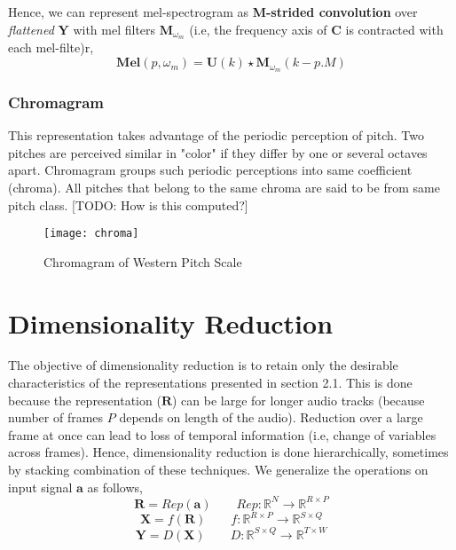 \noindent Hence, we can represent mel-spectrogram as \textbf{M-strided convolution} over \textit{flattened} $\textbf{Y}$ with mel filters $\textbf{M}_{\omega_{m}}$ (i.e, the frequency axis of $\textbf{C}$ is contracted with each mel-filte)r, 
\begin{equation}
\boxed
{
  \textbf{Mel}(p, \omega_{m} ) = \textbf{U}(k) \star \textbf{M}_{\omega_{m}}(k - p.M)
}
\end{equation}
  
\subsubsection{Chromagram}

This representation takes advantage of the periodic perception of pitch. Two pitches are perceived similar in "color" if they differ by one or several octaves apart. Chromagram groups such periodic perceptions into same coefficient (chroma). All pitches that belong to the same chroma are said to be from same pitch class. [TODO: How is this computed?]
\begin{figure}[h] 
\centering
\texttt{[image: chroma]}
\caption{Chromagram of Western Pitch Scale}
 \label{fig:Chromagram}
 \end{figure}
\FloatBarrier
\bigskip

\section{Dimensionality Reduction}
\label{dimension}
The objective of dimensionality reduction is to retain only the desirable characteristics of the representations presented in section 2.1. This is done because the representation ($\textbf{R}$) can be large for longer audio tracks (because number of frames $P$ depends on length of the audio). Reduction over a large frame at once can lead to loss of temporal information (i.e, change of variables across frames). Hence, dimensionality reduction is done hierarchically, sometimes by stacking combination of these techniques. We generalize the operations on input signal $\textbf{a}$ as follows,
\[
   \textbf{R} = Rep(\textbf{a}) \qquad Rep : \mathbb{R}^{N} \rightarrow \mathbb{R}^{R \times P}
\]
\[
   \textbf{X} = f(\textbf{R}) \qquad f : \mathbb{R}^{R \times P} \rightarrow \mathbb{R}^{S \times Q} 
\]
\[
   \textbf{Y} = D(\textbf{X}) \qquad D : \mathbb{R}^{S \times Q} \rightarrow \mathbb{R}^{T \times W} 
\] 

